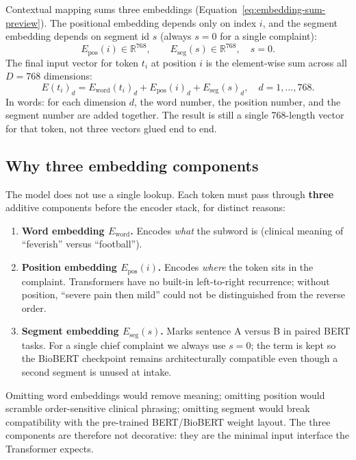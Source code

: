 Contextual mapping sums three embeddings (Equation~\eqref{eq:embedding-sum-preview}). The positional embedding depends only on index \(i\), and the segment embedding depends on segment id \(s\) (always \(s=0\) for a single complaint):
\begin{equation}
  E_{\mathrm{pos}}(i) \in \mathbb{R}^{768}, \qquad E_{\mathrm{seg}}(s) \in \mathbb{R}^{768}, \quad s = 0.
\end{equation}
The final input vector for token \(t_i\) at position \(i\) is the element-wise sum across all \(D=768\) dimensions:
\begin{equation}
  E(t_i)_d = E_{\mathrm{word}}(t_i)_d + E_{\mathrm{pos}}(i)_d + E_{\mathrm{seg}}(s)_d, \quad d = 1, \ldots, 768.
  \label{eq:embedding-sum-full}
\end{equation}
In words: for each dimension \(d\), the word number, the position number, and the segment number are added together. The result is still a single 768-length vector for that token, not three vectors glued end to end.

\subsection{Why three embedding components}

The model does not use a single lookup. Each token must pass through \textbf{three} additive components before the encoder stack, for distinct reasons:
\begin{enumerate}
\item \textbf{Word embedding \(E_{\mathrm{word}}\).} Encodes \emph{what} the subword is (clinical meaning of ``feverish'' versus ``football'').
\item \textbf{Position embedding \(E_{\mathrm{pos}}(i)\).} Encodes \emph{where} the token sits in the complaint. Transformers have no built-in left-to-right recurrence; without position, ``severe pain then mild'' could not be distinguished from the reverse order.
\item \textbf{Segment embedding \(E_{\mathrm{seg}}(s)\).} Marks sentence A versus B in paired BERT tasks. For a single chief complaint we always use \(s=0\); the term is kept so the BioBERT checkpoint remains architecturally compatible even though a second segment is unused at intake.
\end{enumerate}
Omitting word embeddings would remove meaning; omitting position would scramble order-sensitive clinical phrasing; omitting segment would break compatibility with the pre-trained BERT/BioBERT weight layout. The three components are therefore not decorative: they are the minimal input interface the Transformer expects.

